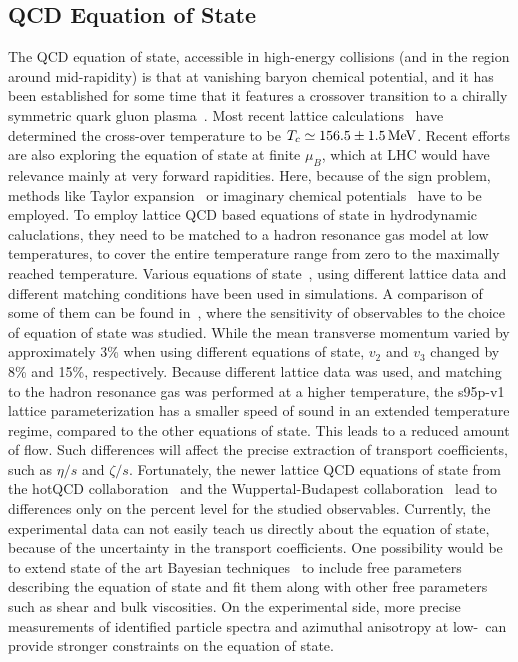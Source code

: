 \subsection{QCD Equation of State}
The QCD equation of state, accessible in high-energy collisions (and in 
  the region around mid-rapidity) is that at vanishing baryon chemical 
  potential, and it has been established for some time that it features 
  a crossover transition to a chirally symmetric quark gluon plasma~\cite{Aoki:2006we}. 
Most recent lattice calculations~\cite{Steinbrecher:2018phh} have determined 
  the cross-over temperature to be $T_c\simeq 156.5 \pm 1.5\,{\rm MeV}$. 
Recent efforts are also exploring the equation of state at finite $\mu_B$, 
  which at LHC would have relevance mainly at very forward rapidities. 
Here, because of the sign problem, methods like Taylor expansion~\cite{Kaczmarek:2011zz,Endrodi:2011gv,Bazavov:2015zja,Bonati:2018nut} 
  or imaginary chemical potentials~\cite{Cea:2014xva,Bonati:2014kpa,Bonati:2015bha,Bellwied:2015rza,Cea:2015cya} 
  have to be employed. 
To employ lattice QCD based equations of state in hydrodynamic caluclations, 
  they need to be matched to a hadron resonance gas model at low temperatures, 
  to cover the entire temperature range from zero to the maximally 
  reached temperature. 
Various equations of state~\cite{Huovinen:2009yb, Borsanyi:2013bia, Bazavov:2014pvz}, 
  using different lattice data and different matching conditions have been used 
  in simulations. 
A comparison of some of them can be found in~\cite{Moreland:2015dvc}, where 
  the sensitivity of observables to the choice of equation of state 
  was studied. 
While the mean transverse momentum varied by approximately 3\% when using 
  different equations of state, $v_2$ and $v_3$ changed by 8\% and 15\%, 
  respectively.
Because different lattice data was used, and matching to the hadron resonance 
  gas was performed at a higher temperature, the s95p-v1 lattice 
  parameterization has a smaller speed of sound in an extended temperature 
  regime, compared to the other equations of state. 
This leads to a reduced amount of flow. 
Such differences will affect the precise extraction of transport coefficients, 
  such as $\eta/s$ and $\zeta/s$. 
Fortunately, the newer lattice QCD equations of state from the hotQCD 
  collaboration~\cite{Bazavov:2014pvz} and the Wuppertal-Budapest 
  collaboration~\cite{Borsanyi:2013bia} lead to differences only on the 
  percent level for the studied observables.
Currently, the experimental data can not easily teach us directly about 
  the equation of state, because of the uncertainty in the transport 
  coefficients. 
One possibility would be to extend state of the art Bayesian techniques~\cite{Moreland:2018gsh} 
  to include free parameters describing the equation of state and fit them 
  along with other free parameters such as shear and bulk viscosities. 
On the experimental side, more precise measurements of identified particle 
  spectra and azimuthal anisotropy at low-\pt\ can provide stronger
  constraints on the equation of state.


